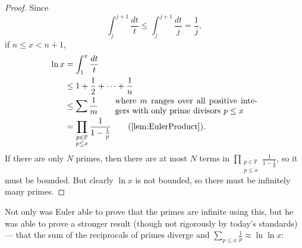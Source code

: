 \documentclass[a4paper]{article}
\theoremstyle{definition}
\theoremstyle{remark}
\begin{document}
\begin{proof}
  Since 
  \[\int_j^{j+1}\frac{dt}{t}\le\int_j^{j+1}\frac{dt}{j}=\frac{1}{j}
  ,
  \]
  if $n\le x<n+1$, 
  \begin{align*}
    \ln x&=\int_1^x\frac{dt}{t}\\
    &\le1+\frac{1}{2}+\dots+\frac{1}{n}\\
    &\le\sum\frac{1}{m}\qquad\parbox{6cm}{where $m$ ranges over all positive integers with only prime divisors $p\le x$}\\
    &=\prod\limits_{\substack{p\in\mathbb{P}\\p\le x}}\frac{1}{1-\frac{1}{p}}\qquad\text{(\Cref{lem:EulerProduct})}
    .
  \end{align*}
  If there are only $N$ primes, then there are at most $N$ terms in $\displaystyle\prod\limits_{\substack{p\in\mathbb{P}\\p\le x}}\frac{1}{1-\frac{1}{p}}$, so it must be bounded. But clearly $\ln x$ is not bounded, so there must be infinitely many primes.
\end{proof}

Not only was Euler able to prove that the primes are infinite using this, but he was able to prove a stronger result (though not rigorously by today's standards) --- that the sum of the reciprocals of primes diverge and $\displaystyle\sum_{p\le x}\frac{1}{p}\approx\ln\ln x$:
\end{document}
